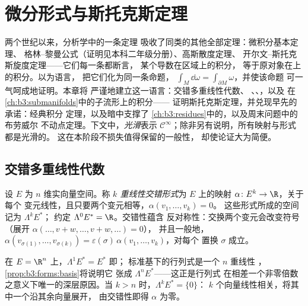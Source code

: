 \chapter{微分形式与斯托克斯定理}\label{ch:b3:forms}

两个世纪以来，分析学中的一条定理
吸收了同类的其他全部定理：微积分基本定理、
格林–黎曼公式（证明见本科二年级分册）、高斯散度定理、
开尔文–斯托克斯旋度定理——它们每一条都断言，
某个导数在区域上的积分，
等于原对象在上的积分。以\emph{}为语言，
把它们化为同一条命题，
$\int_M\dd\omega = \int_{\partial M}\omega$，并使该命题
可一气呵成地证明。本章将
严谨地建立这一语言：交错多重线性代数、
、、，以及
在\cref{ch:b3:submanifolds}中的子流形上的积分——
证明斯托克斯定理，并兑现早先的承诺：经典积分
定理，以及暗中支撑了
\cref{ch:b3:residues}中的，以及周末问题中的布劳威尔
不动点定理。下文中，\emph{光滑}表示 $\mathcal
C^\infty$；除非另有说明，所有映射与形式都是光滑的。
这在本阶段不损失值得保留的一般性，
却使论证大为简便。

\section{交错多重线性代数}

\begin{definition}\label{def:b3:forms:alternating}
设 $E$ 为 $n$ 维实向量空间。称
\emph{$k$ 重线性交错形式}为
$E$ 上的映射 $\alpha\colon E^k \to \R$，关于每个
变元线性，且只要两个变元相等，$\alpha(v_1, \dots, v_k) = 0$。
这些形式所成的空间记为 $\Lambda^k E^*$；
约定 $\Lambda^0E^* = \R$。交错性蕴含
反对称性：交换两个变元会改变符号
（展开 $\alpha(\dots, v + w, \dots, v + w, \dots) = 0$），
并且一般地，$\alpha(v_{\sigma(1)}, \dots, v_{\sigma(k)}) =
\varepsilon(\sigma)\,\alpha(v_1, \dots, v_k)$，对每个
置换 $\sigma$ 成立。
\end{definition}

\begin{example}
在 $E = \R^n$ 上，$\Lambda^1E^* = E^*$ 即；
标准基下的行列式是一个 $n$ 重线性
，\cref{prop:b3:forms:basis}将说明它
张成 $\Lambda^nE^*$——这正是行列式
在相差一个非零倍数之意义下唯一的深层原因。当 $k > n$ 时，$\Lambda^kE^* = \{0\}$：
$k$ 个向量线性相关，将其中一个沿其余向量展开，
由交错性即得 $\alpha$ 为零。
\end{example}

